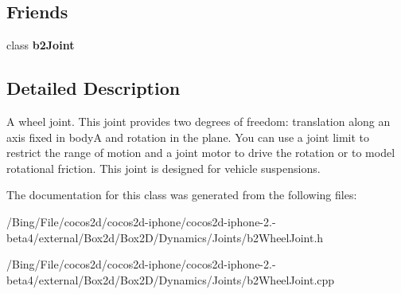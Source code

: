 \subsection*{Friends}
\begin{DoxyCompactItemize}
\item 
\hypertarget{classb2_wheel_joint_a54ade8ed3d794298108d7f4c4e4793fa}{class {\bfseries b2\-Joint}}\label{classb2_wheel_joint_a54ade8ed3d794298108d7f4c4e4793fa}

\end{DoxyCompactItemize}


\subsection{Detailed Description}
A wheel joint. This joint provides two degrees of freedom\-: translation along an axis fixed in body\-A and rotation in the plane. You can use a joint limit to restrict the range of motion and a joint motor to drive the rotation or to model rotational friction. This joint is designed for vehicle suspensions. 

The documentation for this class was generated from the following files\-:\begin{DoxyCompactItemize}
\item 
/\-Bing/\-File/cocos2d/cocos2d-\/iphone/cocos2d-\/iphone-\/2.-\/beta4/external/\-Box2d/\-Box2\-D/\-Dynamics/\-Joints/b2\-Wheel\-Joint.\-h\item 
/\-Bing/\-File/cocos2d/cocos2d-\/iphone/cocos2d-\/iphone-\/2.-\/beta4/external/\-Box2d/\-Box2\-D/\-Dynamics/\-Joints/b2\-Wheel\-Joint.\-cpp\end{DoxyCompactItemize}
